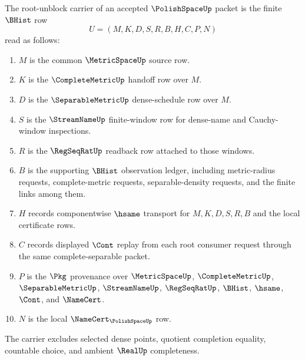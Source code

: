\begin{definition}
\label{def:polish-space-root-unblock-carrier}
The root-unblock carrier of an accepted $\PolishSpaceUp$ packet is the finite $\BHist$ row
$$
U=(M,K,D,S,R,B,H,C,P,N)
$$
read as follows:
\begin{enumerate}
\item $M$ is the common $\MetricSpaceUp$ source row.
\item $K$ is the $\CompleteMetricUp$ handoff row over $M$.
\item $D$ is the $\SeparableMetricUp$ dense-schedule row over $M$.
\item $S$ is the $\StreamNameUp$ finite-window row for dense-name and Cauchy-window inspections.
\item $R$ is the $\RegSeqRatUp$ readback row attached to those windows.
\item $B$ is the supporting $\BHist$ observation ledger, including metric-radius requests, complete-metric requests, separable-density requests, and the finite links among them.
\item $H$ records componentwise $\hsame$ transport for $M,K,D,S,R,B$ and the local certificate rows.
\item $C$ records displayed $\Cont$ replay from each root consumer request through the same complete-separable packet.
\item $P$ is the $\Pkg$ provenance over $\MetricSpaceUp$, $\CompleteMetricUp$, $\SeparableMetricUp$, $\StreamNameUp$, $\RegSeqRatUp$, $\BHist$, $\hsame$, $\Cont$, and $\NameCert$.
\item $N$ is the local $\NameCert_{\PolishSpaceUp}$ row.
\end{enumerate}
The carrier excludes selected dense points, quotient completion equality, countable choice, and ambient $\RealUp$ completeness.
\end{definition}

